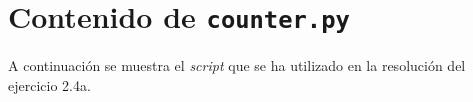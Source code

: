 \chapter{Contenido de \texttt{counter.py}}
A continuación se muestra el \textit{script} que se ha utilizado en la resolución del ejercicio 2.4a.


